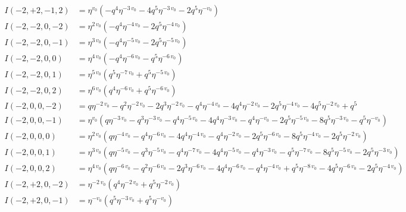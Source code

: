 \documentclass{article}
\begin{document}
\begin{align*}
I(-2, +2, -1, 2) &= \eta^{v_{0}} \left( -q^{4} \eta^{-3 \, v_{0}} - 4 q^{5} \eta^{-3 \, v_{0}} - 2 q^{5} \eta^{-v_{0}} \right) \\
I(-2, -2, 0, -2) &= \eta^{2 \, v_{0}} \left( -q^{4} \eta^{-4 \, v_{0}} - 2 q^{5} \eta^{-4 \, v_{0}} \right) \\
I(-2, -2, 0, -1) &= \eta^{3 \, v_{0}} \left( -q^{4} \eta^{-5 \, v_{0}} - 2 q^{5} \eta^{-5 \, v_{0}} \right) \\
I(-2, -2, 0, 0) &= \eta^{4 \, v_{0}} \left( -q^{4} \eta^{-6 \, v_{0}} - q^{5} \eta^{-6 \, v_{0}} \right) \\
I(-2, -2, 0, 1) &= \eta^{5 \, v_{0}} \left( q^{5} \eta^{-7 \, v_{0}} + q^{5} \eta^{-5 \, v_{0}} \right) \\
I(-2, -2, 0, 2) &= \eta^{6 \, v_{0}} \left( q^{4} \eta^{-6 \, v_{0}} + q^{5} \eta^{-6 \, v_{0}} \right) \\
I(-2, 0, 0, -2) &= q \eta^{-2 \, v_{0}} - q^{2} \eta^{-2 \, v_{0}} - 2 q^{3} \eta^{-2 \, v_{0}} - q^{4} \eta^{-4 \, v_{0}} - 4 q^{4} \eta^{-2 \, v_{0}} - 2 q^{5} \eta^{-4 \, v_{0}} - 4 q^{5} \eta^{-2 \, v_{0}} + q^{5} \\
I(-2, 0, 0, -1) &= \eta^{v_{0}} \left( q \eta^{-3 \, v_{0}} - q^{3} \eta^{-3 \, v_{0}} - q^{4} \eta^{-5 \, v_{0}} - 4 q^{4} \eta^{-3 \, v_{0}} - q^{4} \eta^{-v_{0}} - 2 q^{5} \eta^{-5 \, v_{0}} - 8 q^{5} \eta^{-3 \, v_{0}} - q^{5} \eta^{-v_{0}} \right) \\
I(-2, 0, 0, 0) &= \eta^{2 \, v_{0}} \left( q \eta^{-4 \, v_{0}} - q^{4} \eta^{-6 \, v_{0}} - 4 q^{4} \eta^{-4 \, v_{0}} - q^{4} \eta^{-2 \, v_{0}} - 2 q^{5} \eta^{-6 \, v_{0}} - 8 q^{5} \eta^{-4 \, v_{0}} - 2 q^{5} \eta^{-2 \, v_{0}} \right) \\
I(-2, 0, 0, 1) &= \eta^{3 \, v_{0}} \left( q \eta^{-5 \, v_{0}} - q^{3} \eta^{-5 \, v_{0}} - q^{4} \eta^{-7 \, v_{0}} - 4 q^{4} \eta^{-5 \, v_{0}} - q^{4} \eta^{-3 \, v_{0}} - q^{5} \eta^{-7 \, v_{0}} - 8 q^{5} \eta^{-5 \, v_{0}} - 2 q^{5} \eta^{-3 \, v_{0}} \right) \\
I(-2, 0, 0, 2) &= \eta^{4 \, v_{0}} \left( q \eta^{-6 \, v_{0}} - q^{2} \eta^{-6 \, v_{0}} - 2 q^{3} \eta^{-6 \, v_{0}} - 4 q^{4} \eta^{-6 \, v_{0}} - q^{4} \eta^{-4 \, v_{0}} + q^{5} \eta^{-8 \, v_{0}} - 4 q^{5} \eta^{-6 \, v_{0}} - 2 q^{5} \eta^{-4 \, v_{0}} \right) \\
I(-2, +2, 0, -2) &= \eta^{-2 \, v_{0}} \left( q^{4} \eta^{-2 \, v_{0}} + q^{5} \eta^{-2 \, v_{0}} \right) \\
I(-2, +2, 0, -1) &= \eta^{-v_{0}} \left( q^{5} \eta^{-3 \, v_{0}} + q^{5} \eta^{-v_{0}} \right) \\

\end{align*}
\end{document}
